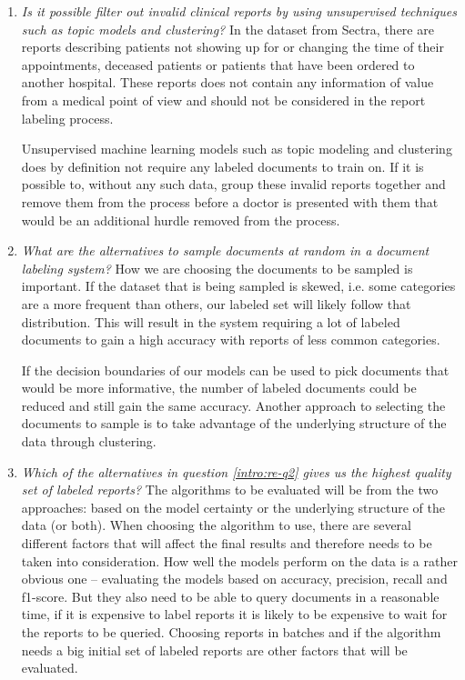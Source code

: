 \begin{enumerate}

\item \textit{Is it possible filter out invalid clinical reports by using unsupervised techniques such as topic models and clustering?}
      \newline
      In the dataset from Sectra, there are reports describing patients not showing up for or changing the time of their appointments, deceased patients or patients that have been ordered to another hospital.
      These reports does not contain any information of value from a medical point of view and should not be considered in the report labeling process.

      Unsupervised machine learning models such as topic modeling and clustering does by definition not require any labeled documents to train on.
      If it is possible to, without any such data, group these invalid reports together and remove them from the process before a doctor is presented with them that would be an additional hurdle removed from the process.

\item \label{intro:re-q2} 
      \textit{What are the alternatives to sample documents at random in a document labeling system?}
      \newline
      How we are choosing the documents to be sampled is important.
      If the dataset that is being sampled is skewed, i.e. some categories are a more frequent than others, our labeled set will likely follow that distribution.
      This will result in the system requiring a lot of labeled documents to gain a high accuracy with reports of less common categories.

      If the decision boundaries of our models can be used to pick documents that would be more informative, the number of labeled documents could be reduced and still gain the same accuracy.
      Another approach to selecting the documents to sample is to take advantage of the underlying structure of the data through clustering.

\item \textit{Which of the alternatives in question \ref{intro:re-q2} gives us the highest quality set of labeled reports?}
      \newline
      The algorithms to be evaluated will be from the two approaches: based on the model certainty or the underlying structure of the data (or both).
      When choosing the algorithm to use, there are several different factors that will affect the final results and therefore needs to be taken into consideration.
      How well the models perform on the data is a rather obvious one -- evaluating the models based on accuracy, precision, recall and f1-score.
      But they also need to be able to query documents in a reasonable time, if it is expensive to label reports it is likely to be expensive to wait for the reports to be queried.
      Choosing reports in batches and if the algorithm needs a big initial set of labeled reports are other factors that will be evaluated.
\end{enumerate}

